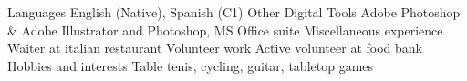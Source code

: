 \iftrue%
\miscSkillRow%
        {Languages}%
        {%
        English (Native), Spanish (C1)%
        }%
\myhline%
\fi\iftrue%
\miscSkillRow%
        {Other Digital Tools}%
        {%
        Adobe Photoshop \& Adobe Illustrator and Photoshop, MS Office suite%
        }%
\myhline%
\fi\iftrue%
\miscSkillRow%
        {Miscellaneous experience}%
        {%
        Waiter at italian restaurant%
        }%
\myhline%
\fi\iftrue%
\miscSkillRow%
        {Volunteer work}%
        {%
        Active volunteer at food bank%
        }%
\myhline%
\fi\iftrue%
\miscSkillRow%
        {Hobbies and interests}%
        {%
        Table tenis, cycling, guitar, tabletop games%
        }%
\myhline%
\fi